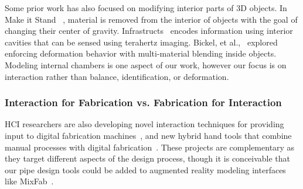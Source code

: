 Some prior work has also focused on modifying interior parts of 3D objects. 
In Make it Stand~ \cite{Prevost-makeitstand}, material is removed from the interior of objects with the goal of changing their center of gravity. Infrastructs~\cite{Willis-infrastructs} encodes information using interior cavities that can be sensed using terahertz imaging. Bickel, et al.,~\cite{Bickel-deformation} explored enforcing deformation behavior with multi-material blending inside objects. Modeling internal chambers is one aspect of our work, however our focus is on interaction rather than balance, identification, or deformation.  

\subsubsection{Interaction for Fabrication vs. Fabrication for Interaction}
HCI researchers are also developing novel interaction techniques for providing input to digital fabrication machines~\cite{Mueller-constructable,Willis-interactive,mixfab}, and new hybrid hand tools that combine manual processes with digital fabrication~\cite{zoran2013freed,rivers2012position}. These projects are complementary as they target different aspects of the design process, though it is conceivable that our pipe design tools could be added to augmented reality modeling interfaces like MixFab~\cite{mixfab}.